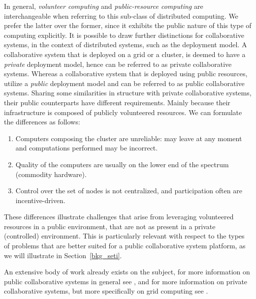 \documentclass[12pt, titlepage]{uo_temp}
\begin{document}
     In general, \emph{volunteer computing} and \emph{public-resource computing} are
     interchangeable when referring to this sub-class of distributed computing. We prefer
     the latter over the former, since it exhibits the public nature of this type of
     computing explicitly.
     It is possible to draw further distinctions for collaborative systems, in the context
     of distributed systems, such as the deployment model. 
     A collaborative system that is deployed on a grid or a cluster, is deemed to have a
     \emph{private} deployment model, hence can be referred to as private collaborative systems.
     Whereas a collaborative system that is deployed using public resources, utilize a
     \emph{public} deployment model and can be referred to as public collaborative systems.
     Sharing some similarities in structure with private collaborative systems, their public
     counterparts have different requirements. Mainly because their infrastructure is
     composed of publicly volunteered resources. We can formulate the differences as follows:
     \begin{enumerate}
     \item Computers composing the cluster are unreliable: may leave at any moment and
       computations performed may be incorrect.
     \item Quality of the computers are usually on the lower end of the spectrum
       (commodity hardware).
     \item Control over the set of nodes is not centralized, and participation often
       are incentive-driven.
     \end{enumerate}
     These differences illustrate challenges that arise from leveraging volunteered
     resources in a public environment, that are not as present in a private
     (controlled) environment. This is particularly relevant with respect to the types of
     problems that are better suited for a public collaborative system platform, as we
     will illustrate in Section~\ref{bkg_seti}.
     
     An extensive body of work already exists on the subject, for more information on
     public collaborative systems in general see \cite{anderson2003public}
     \cite{anderson2006computational}, and for more information on private collaborative
     systems, but more specifically on grid computing see \cite{berman2003grid}.
     
\end{document}
